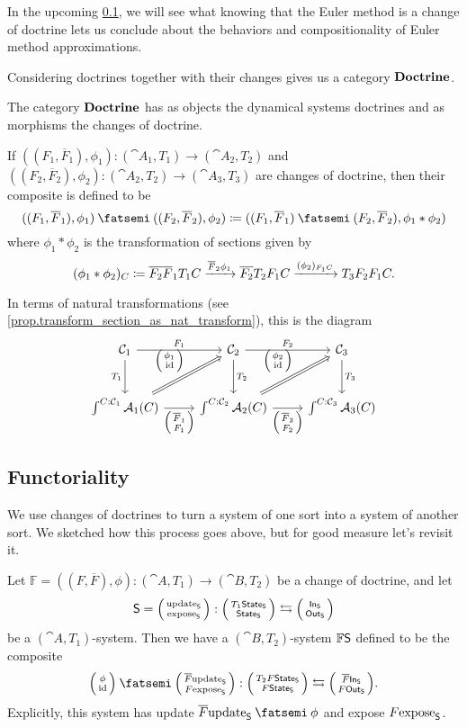 \documentclass[DynamicalBook]{subfiles}
\begin{document}

In the upcoming \cref{sec:functoriality.of.sys}, we will see what knowing that
the Euler method is a change of doctrine lets us conclude about the behaviors
and compositionality of Euler method approximations. 

Considering doctrines together with their changes gives us a category
$\textbf{Doctrine}$. 

\begin{definition}\label{def.category_of_doctrines}
  The category $\textbf{Doctrine}$ has as objects the dynamical systems doctrines
  and as morphisms the changes of doctrine.

  If $((F_1, \overline{F}_1), \phi_1) : (\cat{A}_1, T_1) \to (\cat{A}_2, T_2)$
  and $((F_2, \overline{F}_2), \phi_2) : (\cat{A}_2, T_2) \to (\cat{A}_3, T_3)$
  are changes of doctrine, then their composite is defined to be
  \[
((F_1, \overline{F}_1), \phi_1) \then ((F_2, \overline{F}_2), \phi_2) \coloneqq
((F_1, \overline{F}_1)\then(F_2, \overline{F}_2), \phi_1 \ast \phi_2)
\]
where $\phi_1 \ast \phi_2$ is the transformation of sections given by
\[
(\phi_1 \ast \phi_2)_C \coloneqq \overline{F_2}\overline{F}_1 T_1 C
\xrightarrow{\overline{F}_2 \phi_1} \overline{F_2} T_2 F_1 C \xrightarrow{(\phi_2)_{F_1 C}} T_3
F_2 F_1 C.
\]

In terms of natural transformations (see
\cref{prop.transform_section_as_nat_transform}), this is the diagram
\[
  \begin{tikzcd}[row sep = large]
    \cat{C}_1 \ar[r, "F_1"]\ar[d, "T_1"'] & \cat{C}_2\ar[r, "F_2"]\ar[d, "T_2"] & \cat{C}_3\ar[d, "T_3"] \\
    \int^{C : \cat{C}_1}\cat{A}_1(C)\ar[r, "{\lens{\overline{F}_1}{F_1}}"']
    \ar[ur, Rightarrow, "{\littlelens{\phi_1}{\id}}"] &\int^{C : \cat{C}_2}\cat{A}_2(C)\ar[r, "{\lens{\overline{F}_2}{F_2}}"']\ar[ur, Rightarrow, "{\littlelens{\phi_2}{\id}}"] &\int^{C : \cat{C}_3}\cat{A}_3(C) 
  \end{tikzcd}
\]
\end{definition}



\subsection{Functoriality}\label{sec:functoriality.of.sys}

We use changes of doctrines to turn a system of one sort into a system of
another sort. We sketched how this process goes above, but for good measure
let's revisit it.
\begin{definition}\label{def.change_of_doctrine_action_systems}
Let $\mathbb{F} = ((F, \overline{F}), \phi) : (\cat{A}, T_1) \to (\cat{B}, T_2)$ be a change of doctrine, and
let
\[
\Sys{S} = \lens{\update{S}}{\expose{S}} : \lens{T_1\State{S}}{\State{S}} \fromto \lens{\In{S}}{\Out{S}}
\]
be a $(\cat{A}, T_1)$-system. Then we have a $(\cat{B}, T_2)$-system $\mathbb{F}
\mathsf{S}$ defined to
be the composite 
\[
\lens{\phi}{\id} \then \lens{\overline{F}\update{S}}{F\expose{S}} : \lens{T_2F\State{S}}{F\State{S}} \fromto \lens{\overline{F}\In{S}}{F\Out{S}}.
\]
Explicitly, this system has update $\overline{F} \update{S} \then \phi$ and
expose $F\mathrm{expose}_{\mathsf{S}}$.
\end{definition}
\end{document}
